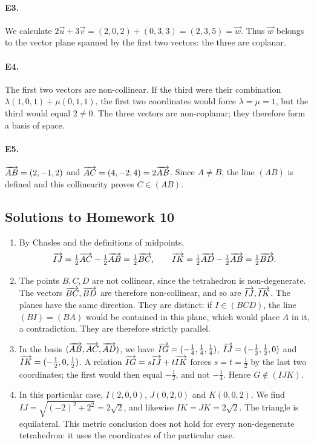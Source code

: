 \paragraph{E3.}We calculate $2\vec u+3\vec v=(2,0,2)+(0,3,3)=(2,3,5)=\vec w$. Thus $\vec w$ belongs to the vector plane spanned by the first two vectors: the three are coplanar.

\paragraph{E4.}The first two vectors are non-collinear. If the third were their combination $\lambda(1,0,1)+\mu(0,1,1)$, the first two coordinates would force $\lambda=\mu=1$, but the third would equal $2\ne0$. The three vectors are non-coplanar; they therefore form a basis of space.

\paragraph{E5.}$\overrightarrow{AB}=(2,-1,2)$ and $\overrightarrow{AC}=(4,-2,4)=2\overrightarrow{AB}$. Since $A\ne B$, the line $(AB)$ is defined and this collinearity proves $C\in(AB)$.

\subsection{Solutions to Homework 10}\begin{enumerate}
\item By Chasles and the definitions of midpoints,
\[\overrightarrow{IJ}=\tfrac12\overrightarrow{AC}-\tfrac12\overrightarrow{AB}=\tfrac12\overrightarrow{BC},\qquad \overrightarrow{IK}=\tfrac12\overrightarrow{AD}-\tfrac12\overrightarrow{AB}=\tfrac12\overrightarrow{BD}.\]
\item The points $B,C,D$ are not collinear, since the tetrahedron is non-degenerate. The vectors $\overrightarrow{BC},\overrightarrow{BD}$ are therefore non-collinear, and so are $\overrightarrow{IJ},\overrightarrow{IK}$. The planes have the same direction. They are distinct: if $I\in(BCD)$, the line $(BI)=(BA)$ would be contained in this plane, which would place $A$ in it, a contradiction. They are therefore strictly parallel.
\item In the basis $(\overrightarrow{AB},\overrightarrow{AC},\overrightarrow{AD})$, we have $\overrightarrow{IG}=(-\frac{1}{4},\frac{1}{4},\frac{1}{4})$, $\overrightarrow{IJ}=(-\frac{1}{2},\frac{1}{2},0)$ and $\overrightarrow{IK}=(-\frac{1}{2},0,\frac{1}{2})$. A relation $\overrightarrow{IG}=s\overrightarrow{IJ}+t\overrightarrow{IK}$ forces $s=t=\frac{1}{2}$ by the last two coordinates; the first would then equal $-\frac{1}{2}$, and not $-\frac{1}{4}$. Hence $G\notin(IJK)$.
\item In this particular case, $I(2,0,0)$, $J(0,2,0)$ and $K(0,0,2)$. We find $IJ=\sqrt{(-2)^2+2^2}=2\sqrt2$, and likewise $IK=JK=2\sqrt2$. The triangle is equilateral. This metric conclusion does not hold for every non-degenerate tetrahedron: it uses the coordinates of the particular case.
\end{enumerate}

